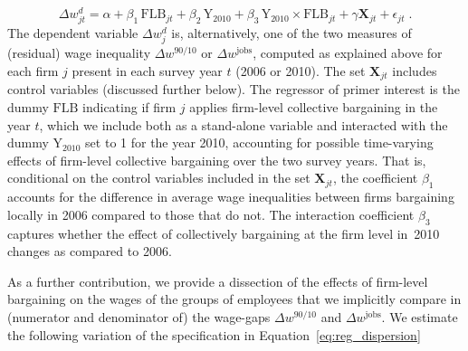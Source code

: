 \documentclass[12pt]{article}
\begin{document}
\begin{equation}
\label{eq:reg_dispersion}
  \Delta w^d_{jt} = \alpha + \beta_1\, \mathrm{FLB}_{jt} + \beta_2\, \mathrm{Y}_{2010} + \beta_3\, \mathrm{Y}_{2010} \times \mathrm{FLB}_{jt} + \gamma\bm{X}_{jt} + \epsilon_{jt} \;.
\end{equation}
The dependent variable $\Delta w^d_{j}$ is, alternatively, one of the
two measures of (residual) wage inequality $\Delta w^{90/10}$ or
$\Delta w^\mathrm{jobs}$, computed as explained above for each firm
$j$ present in each survey year $t$ (2006 or 2010). The set
$\bm{X}_{jt}$ includes control variables (discussed further below).
The regressor of primer interest is the dummy $\mathrm{FLB}$
indicating if firm $j$ applies firm-level collective bargaining in the
year $t$, which we include both as a stand-alone variable and
interacted with the dummy $\mathrm{Y}_{2010}$ set to 1 for the year
2010, accounting for possible time-varying effects of firm-level
collective bargaining over the two survey years. That is, conditional
on the control variables included in the set $\bm{X}_{jt}$, the
coefficient $\beta_1$ accounts for the difference in average wage
inequalities between firms bargaining locally in 2006 compared to
those that do not. The interaction coefficient $\beta_3$ captures
whether the effect of collectively bargaining at the firm level
in~2010 changes as compared to 2006.


As a further contribution, we provide a dissection of the effects of
firm-level bargaining on the wages of the groups of employees that we
implicitly compare in (numerator and denominator of) the wage-gaps
$\Delta w^{90/10}$ and $\Delta w^\mathrm{jobs}$. We estimate the
following variation of the specification in
Equation~\eqref{eq:reg_dispersion}
\end{document}
